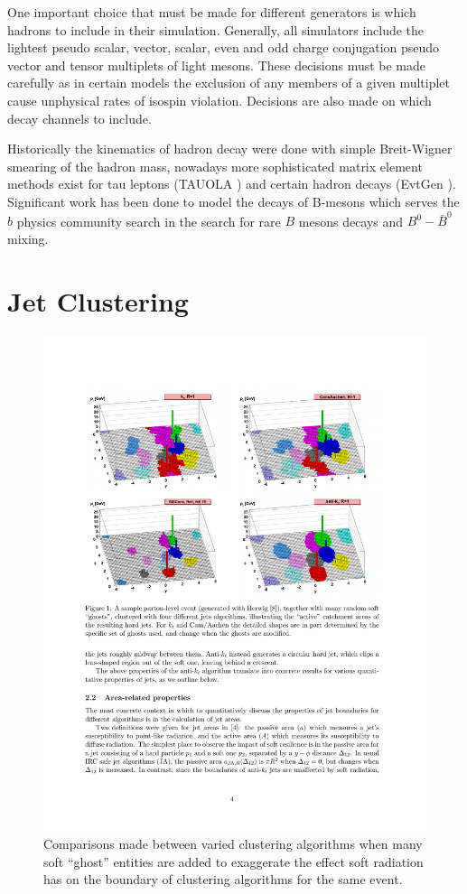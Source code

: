 One important choice that must be made for different generators is which hadrons to include in their simulation. Generally,
all simulators include the lightest pseudo scalar, vector, scalar, even and odd charge conjugation pseudo 
vector and tensor multiplets of light mesons. These decisions must be made carefully as in certain models the exclusion of any members of a given multiplet cause unphysical rates of isospin violation. Decisions are also made on which decay channels to include.

Historically the kinematics of hadron decay were done with simple Breit-Wigner smearing of the hadron mass,
nowadays more sophisticated matrix element methods exist for tau leptons (TAUOLA \cite{tauola}) and certain hadron decays (EvtGen \cite{evtgen}). Significant work has been done to model the decays of B-mesons which serves the $b$ physics community
search in the search for rare $B$ mesons decays and $B^0-\bar{B}^0$ mixing. 
\section{Jet Clustering}

\begin{figure}
\begin{center}
\includegraphics[width=.9\textwidth]{pics/antikt}
\end{center}
\caption{Comparisons made between varied clustering algorithms when many soft ``ghost'' entities are added
to exaggerate the effect soft radiation has on the boundary of clustering algorithms for the same event.}
\label{fig:antikt}
\end{figure}

